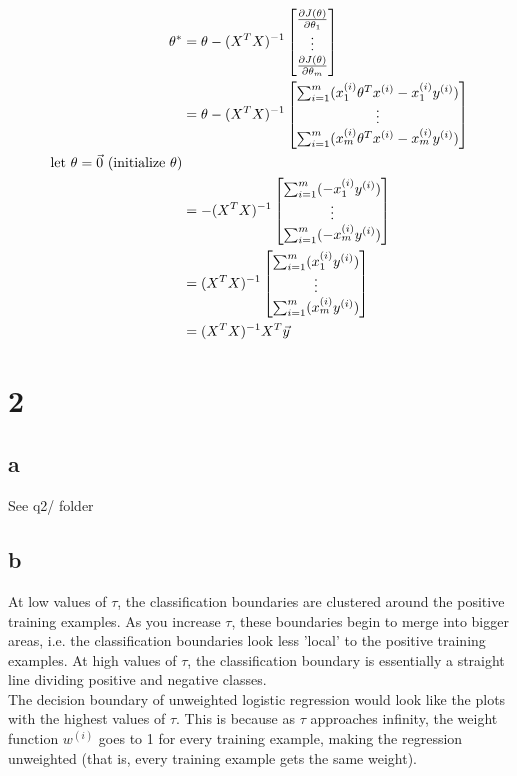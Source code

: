 \documentclass[11pt]{article}
\begin{document}
\begin{align*}
  \theta^{*} &= 
  \theta - (X^{T} X)^{-1}
  \begin{bmatrix}
    \frac{\partial J(\theta)}{\partial\theta_{1}} \\
    \vdots \\
    \frac{\partial J(\theta)}{\partial\theta_{m}}
  \end{bmatrix}
  \\ &= 
  \theta - (X^{T} X)^{-1}
  \begin{bmatrix}
    \sum_{i=1}^{m} ( x_{1}^{(i)} \theta^{T} x^{(i)} - x_{1}^{(i)} y^{(i)} ) \\
    \vdots \\
    \sum_{i=1}^{m} ( x_{m}^{(i)} \theta^{T} x^{(i)} - x_{m}^{(i)} y^{(i)} )
  \end{bmatrix}
  \\ \text{let $\theta = \vec{0}$ (initialize $\theta$)}
  \\ &= 
  - (X^{T} X)^{-1}
  \begin{bmatrix}
    \sum_{i=1}^{m} ( - x_{1}^{(i)} y^{(i)} ) \\
    \vdots \\
    \sum_{i=1}^{m} ( - x_{m}^{(i)} y^{(i)} )
  \end{bmatrix}
  \\ &=
  (X^{T} X)^{-1}
  \begin{bmatrix}
    \sum_{i=1}^{m} ( x_{1}^{(i)} y^{(i)} ) \\
    \vdots \\
    \sum_{i=1}^{m} ( x_{m}^{(i)} y^{(i)} )
  \end{bmatrix}
  \\ &=
  (X^{T} X)^{-1} X^{T} \vec{y}
\end{align*}
  


\section*{2}

\subsection*{a}
See q2/ folder

\subsection*{b}
At low values of $\tau$, the classification boundaries are clustered around the positive training examples. As you increase $\tau$, these boundaries begin to merge into bigger areas, i.e. the classification boundaries look less 'local' to the positive training examples. At high values of $\tau$, the classification boundary is essentially a straight line dividing positive and negative classes. \\

The decision boundary of unweighted logistic regression would look like the plots with the highest values of $\tau$. This is because as $\tau$ approaches infinity, the weight function $w^{(i)}$ goes to 1 for every training example, making the regression unweighted (that is, every training example gets the same weight).
\end{document}
